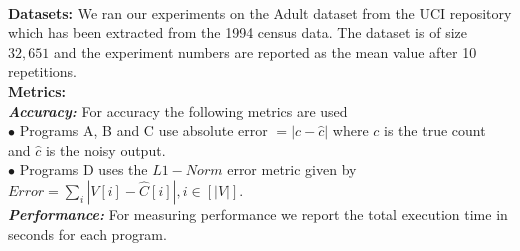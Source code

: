 \\\textbf{Datasets:}
We ran our experiments on the Adult dataset from the UCI repository \cite{UCI}  which has been extracted from the 1994 census data. The dataset is of size $32,651$ and the experiment numbers are reported as the mean value after 10 repetitions.
\\\textbf{Metrics:}
\\\textbf{\textit{Accuracy:}} For accuracy the following metrics are used
\\$\bullet$ Programs A, B and C use absolute error $ =|c-\hat{c}|$ where $c$ is the true count and $\hat{c}$ is the noisy output.\\ $\bullet$ Programs D uses the $L1-Norm$ error metric given  by $Error=\sum_{i}|V[i]-\hat{C}[i]|, i \in [|V|]$.\\
\textbf{\textit{Performance:}} For measuring performance we report the total execution time in seconds for each program.





